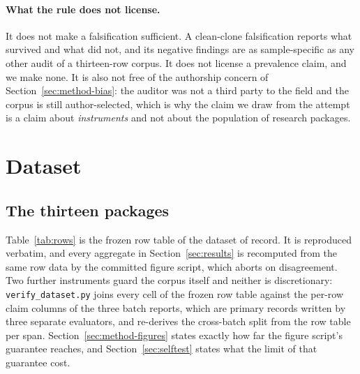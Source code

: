\documentclass[sigconf,review]{acmart}
\begin{document}
\paragraph{What the rule does not license.} It does not make a falsification
sufficient. A clean-clone falsification reports what survived and what did
not, and its negative findings are as sample-specific as any other audit of a
thirteen-row corpus. It does not license a prevalence claim, and we make
none. It is also not free of the authorship concern of
Section~\ref{sec:method-bias}: the auditor was not a third party to the field
and the corpus is still author-selected, which is why the claim we draw from
the attempt is a claim about \emph{instruments} and not about the population
of research packages.

\section{Dataset}
\label{sec:dataset}

\subsection{The thirteen packages}
\label{sec:dataset-13}

Table~\ref{tab:rows} is the frozen row table of the dataset of record. It is
reproduced verbatim, and every aggregate in Section~\ref{sec:results} is
recomputed from the same row data by the committed figure script, which aborts
on disagreement. Two further instruments guard the corpus itself and neither is
discretionary: \texttt{verify\_dataset.py} joins every cell of the frozen row
table against the per-row claim columns of the three batch reports, which are
primary records written by three separate evaluators, and re-derives the
cross-batch split from the row table per span. Section~\ref{sec:method-figures}
states exactly how far the figure script's guarantee reaches, and
Section~\ref{sec:selftest} states what the limit of that guarantee cost.
\end{document}
